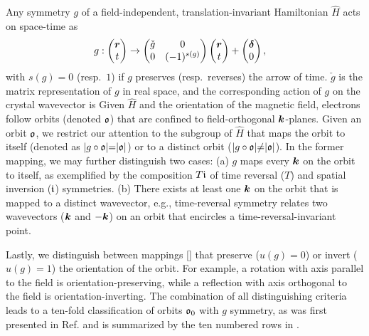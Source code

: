 \documentclass[aps, prb, showpacs, twocolumn, notitlepage, superscriptaddress]{revtex4-1}
\begin{document}
Any symmetry $g$ of a field-independent, translation-invariant Hamiltonian $\hat{H}$ acts on space-time as
\begin{align}
&g: \begin{pmatrix} {\boldsymbol{r}}\\{t} \end{pmatrix} \rightarrow \begin{pmatrix} \check{g} & 0 \\ 0 &  (-1)^{s(g)} \end{pmatrix}\begin{pmatrix} {\boldsymbol{r}}\\{t} \end{pmatrix}+\begin{pmatrix} {\boldsymbol{\delta}}\\{0} \end{pmatrix}, \label{definesg}
\end{align}
with $s(g){=}0$ (resp.\ $1$) if $g$ preserves (resp.\  reverses) the arrow of time. $\check{g}$ is the matrix representation of $g$ in real space, and the corresponding action of  $g$ on the crystal wavevector is  
Given $\hat{H}$ and the orientation of the magnetic field, electrons follow orbits (denoted $\mathfrak{o}$) that are confined to field-orthogonal $\boldsymbol{k}$-planes.  Given an orbit $\mathfrak{o}$, we restrict our attention to the subgroup of $\hat{H}$ that maps the orbit to itself (denoted as $|g\circ\mathfrak{o}|{=}|\mathfrak{o}|$) or to a distinct orbit ($|g\circ\mathfrak{o}|{\ne}|\mathfrak{o}|$). In the former mapping, we may further distinguish two cases: (a)  $g$ maps every $\boldsymbol{k}$ on the orbit to itself, as exemplified by the composition $T\mathfrak{i}$ of time reversal ($T$) and spatial inversion ($\mathfrak{i}$)  symmetries. (b) There exists at least one $\boldsymbol{k}$ on the orbit that is mapped to a distinct wavevector, e.g., time-reversal symmetry relates two wavevectors ($\boldsymbol{k}$ and ${-}\boldsymbol{k}$) on an orbit that encircles a time-reversal-invariant point. 

Lastly, we distinguish  between mappings [] that preserve  ($u(g){=}0$) or invert ($u(g){=}1$) the orientation of the orbit. For example, a rotation with axis parallel to the field is orientation-preserving, while a reflection with axis orthogonal to the field is orientation-inverting. The combination of all distinguishing criteria leads to   a ten-fold classification of orbits $\mathfrak{o}_0$ with $g$ symmetry, as was first presented in Ref.  and is summarized by the ten numbered rows in .

\end{document}
